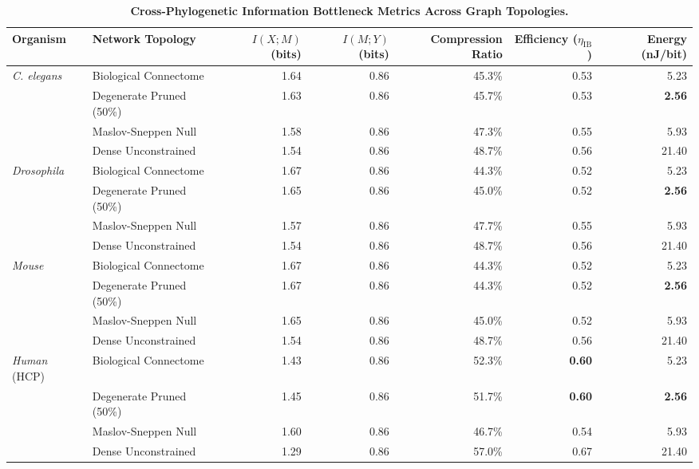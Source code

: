 \documentclass[11pt,letterpaper]{report}
\begin{document}
\begin{table}[t]
\centering
\small
\caption{\textbf{Cross-Phylogenetic Information Bottleneck Metrics Across Graph Topologies.}}
\label{tab:ib_mono}
\begin{tabular}{llrrrrr}
\toprule
\textbf{Organism} & \textbf{Network Topology} & \textbf{$I(X; M)$ (bits)} & \textbf{$I(M; Y)$ (bits)} & \textbf{Compression Ratio} & \textbf{Efficiency ($\eta_{\mathrm{IB}}$)} & \textbf{Energy (nJ/bit)} \\
\midrule
\textit{C. elegans} & Biological Connectome & 1.64 & 0.86 & 45.3\% & 0.53 & 5.23 \\
& Degenerate Pruned (50\%) & 1.63 & 0.86 & 45.7\% & 0.53 & \textbf{2.56} \\
& Maslov-Sneppen Null & 1.58 & 0.86 & 47.3\% & 0.55 & 5.93 \\
& Dense Unconstrained & 1.54 & 0.86 & 48.7\% & 0.56 & 21.40 \\
\midrule
\textit{Drosophila} & Biological Connectome & 1.67 & 0.86 & 44.3\% & 0.52 & 5.23 \\
& Degenerate Pruned (50\%) & 1.65 & 0.86 & 45.0\% & 0.52 & \textbf{2.56} \\
& Maslov-Sneppen Null & 1.57 & 0.86 & 47.7\% & 0.55 & 5.93 \\
& Dense Unconstrained & 1.54 & 0.86 & 48.7\% & 0.56 & 21.40 \\
\midrule
\textit{Mouse} & Biological Connectome & 1.67 & 0.86 & 44.3\% & 0.52 & 5.23 \\
& Degenerate Pruned (50\%) & 1.67 & 0.86 & 44.3\% & 0.52 & \textbf{2.56} \\
& Maslov-Sneppen Null & 1.65 & 0.86 & 45.0\% & 0.52 & 5.93 \\
& Dense Unconstrained & 1.54 & 0.86 & 48.7\% & 0.56 & 21.40 \\
\midrule
\textit{Human} (HCP) & Biological Connectome & 1.43 & 0.86 & 52.3\% & \textbf{0.60} & 5.23 \\
& Degenerate Pruned (50\%) & 1.45 & 0.86 & 51.7\% & \textbf{0.60} & \textbf{2.56} \\
& Maslov-Sneppen Null & 1.60 & 0.86 & 46.7\% & 0.54 & 5.93 \\
& Dense Unconstrained & 1.29 & 0.86 & 57.0\% & 0.67 & 21.40 \\
\bottomrule
\end{tabular}
\end{table}
\end{document}
